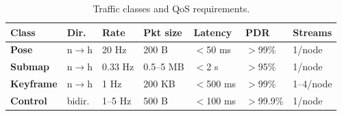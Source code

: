 \begin{table}[t]
  \centering
  \caption{Traffic classes and QoS requirements.}
  \label{tab:traffic}
  \footnotesize
  \setlength{\tabcolsep}{3pt}
  \begin{tabular}{@{}p{1.3cm}p{1.6cm}p{1.0cm}p{1.3cm}p{0.9cm}p{0.8cm}p{1.0cm}@{}}
    \toprule
    Class & Dir. & Rate & Pkt size & Latency & PDR & Streams \\
    \midrule
    \textbf{Pose}     & n$\to$h & 20 Hz  & 200 B    & $<$50 ms  & $>$99\%   & 1/node \\
    \textbf{Submap}   & n$\to$h & 0.33 Hz& 0.5--5 MB& $<$2 s    & $>$95\%   & 1/node \\
    \textbf{Keyframe} & n$\to$h & 1 Hz   & 200 KB   & $<$500 ms & $>$99\%   & 1--4/node \\
    \textbf{Control}  & bidir.  & 1--5 Hz& 500 B    & $<$100 ms & $>$99.9\% & 1/node \\
    \bottomrule
  \end{tabular}
\end{table}
